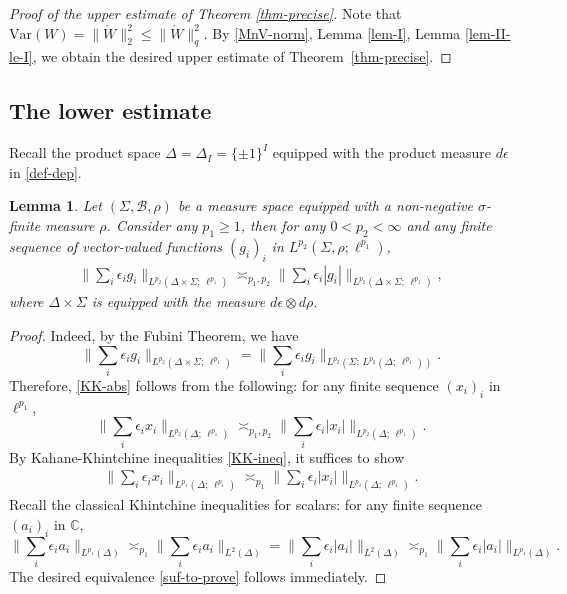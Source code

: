 \documentclass[12pt]{amsart}
\newtheorem{lemma}[theorem]{Lemma}
\theoremstyle{definition}
\theoremstyle{remark}
\newcommand{\C}{\mathbb{C}}
\newcommand{\Var}{\mathrm{Var}}
\numberwithin{equation}{section}
\begin{document}
\begin{proof}[Proof of the upper estimate of Theorem \ref{thm-precise}]
Note that  $\Var(W)  =   \|\mathring{W}\|_2^2 \le  \|\mathring{W}\|_q^2$. 
By  \eqref{MnV-norm}, Lemma \ref{lem-I}, Lemma \ref{lem-II-le-I},  we obtain the desired upper estimate of Theorem~\ref{thm-precise}. 
\end{proof}

\subsection{The lower estimate}\label{sec-low}

Recall the product space  $\Delta  = \Delta_I= \{\pm 1\}^I$ equipped with the product measure $d\epsilon$ in \eqref{def-dep}.  
\begin{lemma}\label{lem-abs}
Let $(\Sigma,  \mathcal{B},  \rho)$  be  a measure space equipped  with a non-negative $\sigma$-finite measure  $\rho$. 
 Consider any $p_1\ge 1$, then for any $0<p_2<\infty$ and  any finite sequence  of vector-valued functions $(g_i)_{i}$ in $L^{p_2}(\Sigma, \rho; \ell^{p_1})$, 
 \begin{align}\label{KK-abs}
\big \| \sum_i \epsilon_i g_i\big\|_{L^{p_2}(\Delta\times \Sigma; \, \ell^{p_1})} \asymp_{p_1, p_2}  \big \| \sum_i \epsilon_i |g_i|\big\|_{L^{p_2}(\Delta\times \Sigma; \, \ell^{p_1})},
 \end{align}
 where  $\Delta\times \Sigma$ is equipped with the measure $d\epsilon \otimes d\rho$.
\end{lemma}
 
\begin{proof}
  Indeed, by the Fubini Theorem, we have 
 \[
 \big \| \sum_i \epsilon_i g_i\big\|_{L^{p_2}(\Delta\times \Sigma; \, \ell^{p_1})} = \big \| \sum_i \epsilon_i g_i\big\|_{L^{p_2}( \Sigma; \, L^{p_2} (\Delta; \, \ell^{p_1}))}. 
 \]
Therefore,   \eqref{KK-abs} follows from the following: for any finite sequence  $(x_i)_{i}$ in $\ell^{p_1}$, 
 \[
 \big \| \sum_i \epsilon_i x_i\big\|_{L^{p_2} (\Delta; \, \ell^{p_1})} \asymp_{p_1, p_2}  \big \| \sum_i \epsilon_i |x_i|\big\|_{L^{p_2}(\Delta; \, \ell^{p_1})}.
 \]
 By Kahane-Khintchine inequalities \eqref{KK-ineq}, it suffices to show 
 \begin{align}\label{suf-to-prove}
 \big \| \sum_i \epsilon_i x_i\big\|_{L^{p_1}(\Delta; \, \ell^{p_1})} \asymp_{p_1} \big \| \sum_i \epsilon_i |x_i|\big\|_{L^{p_1}(\Delta; \, \ell^{p_1})}. 
 \end{align}
 Recall the classical  Khintchine inequalities for scalars: for any finite sequence $(a_i)_{i}$ in $\C$, 
 \[
 \big \| \sum_i \epsilon_i a_i\big\|_{L^{p_1}(\Delta)}  \asymp_{p_1} \big \| \sum_i \epsilon_i a_i\big\|_{L^2(\Delta)}  = \| \sum_i \epsilon_i |a_i|\big\|_{L^2(\Delta)}  \asymp_{p_1} \| \sum_i \epsilon_i |a_i|\big\|_{L^{p_1}(\Delta)}. 
 \]
 The desired equivalence \eqref{suf-to-prove} follows immediately. 
\end{proof}
\end{document}
